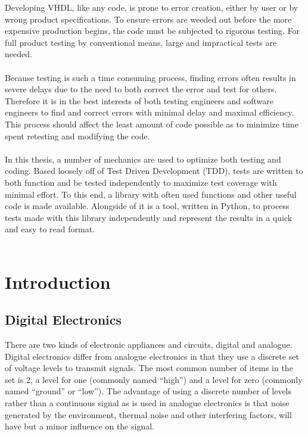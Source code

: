 \documentclass[11pt,british]{article}
\begin{document}
Developing VHDL, like any code, is prone to error creation, either by user or by wrong product specifications. To ensure errors are weeded out before the more expensive production begins, the code must be subjected to rigorous testing. For full product testing by conventional means, large and impractical tests are needed.
\\
\\
Because testing is such a time consuming process, finding errors often
results in severe delays due to the need to both correct the error
and test for others. Therefore it is in the best interests of both
testing engineers and software engineers to find and correct errors
with minimal delay and maximal efficiency. This process should affect
the least amount of code possible as to minimize time spent retesting
and modifying the code.
\\
\\
In this thesis, a number of mechanics are used to optimize both testing
and coding. Based loosely off of Test Driven Development (TDD), tests
are written to both function and be tested independently to maximize
test coverage with minimal effort. To this end, a library with often
used functions and other useful code is made available. Alongside
of it is a tool, written in Python, to process tests made with this
library independently and represent the results in a quick and easy
to read format.
\\
\\


\newpage{}


\section{Introduction}


\subsection{Digital Electronics}

There are two kinds of electronic appliances and circuits, digital
and analogue. Digital electronics differ from analogue electronics
in that they use a discrete set of voltage levels to transmit signals.
The most common number of items in the set is 2, a level for one (commonly
named ``high'') and a level for zero (commonly named ``ground''
or ``low''). The advantage of using a discrete number of levels
rather than a continuous signal as is used in analogue electronics
is that noise generated by the environment, thermal noise and other
interfering factors, will have but a minor influence on the signal.\\
\end{document}

